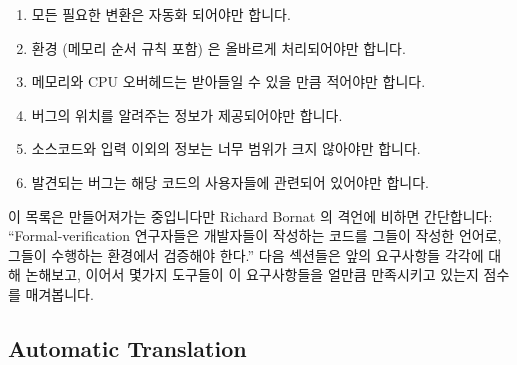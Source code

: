 \begin{enumerate}
\item	모든 필요한 변환은 자동화 되어야만 합니다.
\item	환경 (메모리 순서 규칙 포함) 은 올바르게 처리되어야만 합니다.
\item	메모리와 CPU 오버헤드는 받아들일 수 있을 만큼 적어야만 합니다.
\item	버그의 위치를 알려주는 정보가 제공되어야만 합니다.
\item	소스코드와 입력 이외의 정보는 너무 범위가 크지 않아야만 합니다.
\item	발견되는 버그는 해당 코드의 사용자들에 관련되어 있어야만 합니다.
\iffalse

\item	Any required translation must be automated.
\item	The environment (including memory ordering) must be correctly
	handled.
\item	The memory and CPU overhead must be acceptably modest.
\item	Specific information leading to the location of the bug
	must be provided.
\item	Information beyond the source code and inputs must be
	modest in scope.
\item	The bugs located must be relevant to the code's users.
\fi
\end{enumerate}

이 목록은 만들어져가는 중입니다만 Richard Bornat 의 격언에 비하면 간단합니다:
``Formal-verification 연구자들은 개발자들이 작성하는 코드를 그들이 작성한
언어로, 그들이 수행하는 환경에서 검증해야 한다.''
다음 섹션들은 앞의 요구사항들 각각에 대해 논해보고, 이어서 몇가지 도구들이 이
요구사항들을 얼만큼 만족시키고 있는지 점수를 매겨봅니다.
\iffalse

This list builds on, but is somewhat more modest than, Richard Bornat's
dictum: ``Formal-verification researchers should verify the code that
developers write, in the language they write it in, running in the
environment that it runs in, as they write it.''
The following sections discuss each of the above requirements, followed
by a section presenting a scorecard of how well a few tools stack up
against these requirements.
\fi

\subsection{Automatic Translation}
\label{sec:formal:Automatic Translation}

